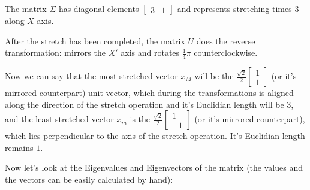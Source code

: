 \documentclass[letterpaper,10pt,english]{jupyterBook}
\begin{document}
\sphinxAtStartPar
The matrix \(\Sigma\) has diagonal elements \(\begin{bmatrix} 3 & 1 \end{bmatrix}\) and represents stretching times 3 along \(X\) axis.

\begin{sphinxVerbatim}[commandchars=\\\{\}]
  \PYG{p}{[}
    \PYG{p}{[} \PYG{p}{]}
    \PYG{p}{[} \PYG{p}{]}
\PYG{p}{]}
  
  \PYG{p}{[}
    \PYG{p}{[} \PYG{p}{]}
    \PYG{p}{[} \PYG{p}{]}
\PYG{p}{]}


\end{sphinxVerbatim}

\sphinxAtStartPar
After the stretch has been completed, the matrix \(U\) does the reverse transformation: mirrors the \(X'\) axis and rotates \(\frac{1}{4}\pi\) counterclockwise.

\sphinxAtStartPar
Now we can say that the most stretched vector \(x_M\) will be the
\(
\frac{\sqrt{2}}{2}
\begin{bmatrix}
1\\
1
\end{bmatrix}
\) (or it’s mirrored counterpart)
unit vector, which during the transformations is aligned along the direction of the stretch operation and it’s Euclidian length will be \(3\), and the least stretched vector \(x_m\) is the
\(
\frac{\sqrt{2}}{2}
\begin{bmatrix}
1\\
-1
\end{bmatrix}
\) (or it’s mirrored counterpart), which lies perpendicular to the axis of the stretch operation. It’s Euclidian length remains \(1\).

\sphinxAtStartPar
Now let’s look at the Eigenvalues and Eigenvectors of the matrix (the values and the vectors can be easily calculated by hand):

\begin{sphinxVerbatim}[commandchars=\\\{\}]
   
 
\end{sphinxVerbatim}
\end{document}

